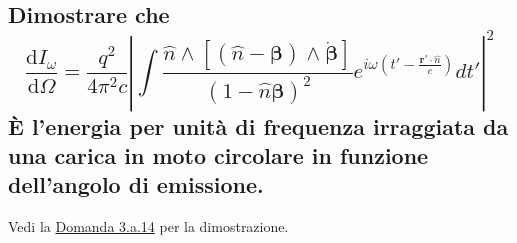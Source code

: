 \subsection[]{Dimostrare che 
\[
	\frac{\mbox{d} I_{\omega}}{\mbox{d} \Omega} = \frac{q^2}{4 \pi^2 c} \left| \int{ \frac{\hat{n} \wedge \left[ \left( \hat{n}-\boldsymbol{\beta}\right) \wedge \dot{\boldsymbol{\beta}} \right]}{\left( 1- \hat{n} \boldsymbol{\beta}\right)^2} e^{i\omega \left( t' - \frac{\boldsymbol{r'} \cdot \hat{n}}{c} \right) }  } dt' \right|^2\]
È l'energia per unità di frequenza irraggiata da una carica in moto circolare in funzione dell'angolo di emissione.
}
\label{sec:5.c.2}
Vedi la \hyperref[sec:3.a.14]{Domanda 3.a.14} per la dimostrazione.

